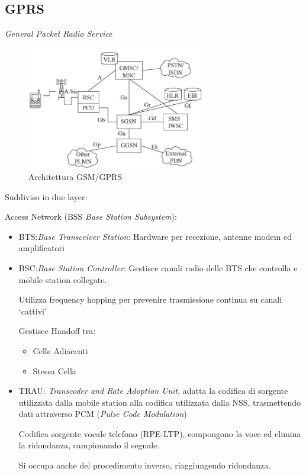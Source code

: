\documentclass{article}
\begin{document}
\subsection{GPRS}
\textit{General Packet Radio Service}
\begin{figure}[h]
\includegraphics[width=0.7\textwidth]{img/sdt/gprs}
\centering
\caption{Architettura GSM/GPRS}
\end{figure}

\bigbreak

Suddiviso in due layer:

Access Network (BSS \textit{Base Station Subsystem}):
\begin{itemize}
    \item BTS:\@\textit{Base Transceiver Station}: Hardware per recezione, antenne modem ed amplificatori
    \item BSC:\@\textit{Base Station Controller}: Gestisce canali radio delle BTS che controlla e mobile station collegate.

        Utilizza frequency hopping per prevenire trasmissione continua su canali `cattivi'

        Gestisce Handoff tra:
        \begin{itemize}
            \item Celle Adiacenti
            \item Stessa Cella
        \end{itemize}
    \item TRAU: \textit{Transcoder and Rate Adoption Unit}, adatta la codifica di sorgente utilizzata dalla mobile station alla codifica utilizzata dalla NSS, trasmettendo dati attraverso PCM (\textit{Pulse Code Modulation})

    Codifica sorgente vocale telefono (RPE-LTP), compongono la voce ed elimina la ridondanza, campionando il segnale.

    Si occupa anche del procedimento inverso, riaggiungendo ridondanza.
\end{itemize}
\end{document}

